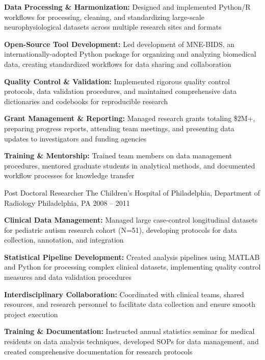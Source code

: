 \begin{cventries}
{\begin{cvitems}
        \item \textbf{Data Processing \& Harmonization:} Designed and implemented Python/R workflows for processing, cleaning, and standardizing large-scale neurophysiological datasets across multiple research sites and formats
        \item \textbf{Open-Source Tool Development:} Led development of MNE-BIDS, an internationally-adopted Python package for organizing and analyzing biomedical data, creating standardized workflows for data sharing and collaboration
        \item \textbf{Quality Control \& Validation:} Implemented rigorous quality control protocols, data validation procedures, and maintained comprehensive data dictionaries and codebooks for reproducible research
        \item \textbf{Grant Management \& Reporting:} Managed research grants totaling \$2M+, preparing progress reports, attending team meetings, and presenting data updates to investigators and funding agencies
        \item \textbf{Training \& Mentorship:} Trained team members on data management procedures, mentored graduate students in analytical methods, and documented workflow processes for knowledge transfer
      \end{cvitems}
    }
  \cventry
    {Post Doctoral Researcher}
    {The Children's Hospital of Philadelphia, Department of Radiology}
    {Philadelphia, PA}
    {2008 -- 2011}
    {
      \begin{cvitems}
        \item \textbf{Clinical Data Management:} Managed large case-control longitudinal datasets for pediatric autism research cohort (N=51), developing protocols for data collection, annotation, and integration
        \item \textbf{Statistical Pipeline Development:} Created analysis pipelines using MATLAB and Python for processing complex clinical datasets, implementing quality control measures and data validation procedures
        \item \textbf{Interdisciplinary Collaboration:} Coordinated with clinical teams, shared resources, and research personnel to facilitate data collection and ensure smooth project execution
        \item \textbf{Training \& Documentation:} Instructed annual statistics seminar for medical residents on data analysis techniques, developed SOPs for data management, and created comprehensive documentation for research protocols
      \end{cvitems}
    }
\end{cventries}
